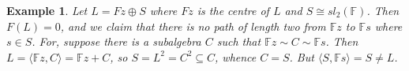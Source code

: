 \documentclass[11pt]{amsart}
\theoremstyle{plain}
\newtheorem{example}[theorem]{Example}
\def\F{\mathbb{F}}
\begin{document}
\begin{example}
Let $L= Fz\oplus S$ where $Fz$ is the centre of $L$ and $S\cong sl_2(\F)$. Then $F(L)=0$, and we claim that there is no path of length two from $\F z$ to $\F s$ where $s\in S$. For, suppose there is a subalgebra $C$ such that $\F z\sim C\sim \F s$. Then $L=\langle\F z,C\rangle=\F z+C$, so  $S=L^2=C^2\subseteq C$, whence $C=S$. But $\langle S,\F s\rangle=S\not = L$.
\end{example}










    
\end{document}
